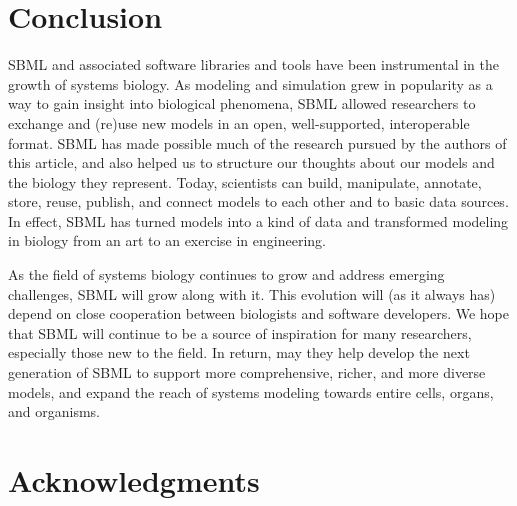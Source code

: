 \documentclass{sbml-paper}
\begin{document}
\section*{Conclusion}

SBML and associated software libraries and tools have been instrumental in the growth of systems biology.  As modeling and simulation grew in popularity as a way to gain insight into biological phenomena, SBML allowed researchers to exchange and (re)use new models in an open, well-supported, interoperable format. SBML has made possible much of the research pursued by the authors of this article, and also helped us to structure our thoughts about our models and the biology they represent.  Today, scientists can build, manipulate, annotate, store, reuse, publish, and connect models to each other and to basic data sources.  In effect, SBML has turned models into a kind of data and transformed modeling in biology from an art to an exercise in engineering.

As the field of systems biology continues to grow and address emerging challenges, SBML will grow along with it.  This evolution will (as it always has) depend on close cooperation between biologists and software developers.  We hope that SBML will continue to be a source of inspiration for many researchers, especially those new to the field.  In return, may they help develop the next generation of SBML to support more comprehensive, richer, and more diverse models, and expand the reach of systems modeling towards entire cells, organs, and organisms.


\section*{Acknowledgments}
\end{document}
